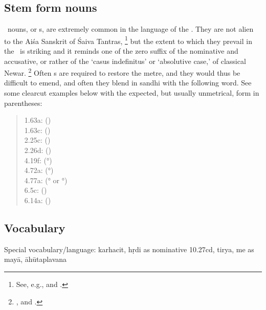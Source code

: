 \subsection{Stem form nouns}\label{stemform}

\Stemform\ nouns, or s, are extremely common in the
language of the \VSS. They are not alien to the Aiśa Sanskrit
of Śaiva Tantras,%
		\footnote{See, e.g.,  and
								.}
but the extent to which they prevail in the \VSS\ is striking and it
reminds one of the zero suffix of the nominative and accusative,
or rather of the `casus indefinitus' or `absolutive case,' of classical Newar.%
		\footnote{,
		 and .} 
Often \stemform s are required to restore the metre, 
and they would thus be difficult to emend,
and often they blend in sandhi with the following word. 
See some clearcut examples below with the expected,
but usually unmetrical, form in parentheses:

\begin{quote}
 1.63a:  () \\
1.63c:  () \\
2.25c:  () \\
2.26d:  () \\
4.19f:  (°) \\
4.72a:  (°) \\
4.77a:  (° or °)
 \\
6.5c:  () \\
6.14a:  () \\
\end{quote}





\subsection{Vocabulary}




  Special vocabulary/language: karhacit, hṛdi as nominative 10.27cd,
  tirya, me as mayā, āhūtaplavana

